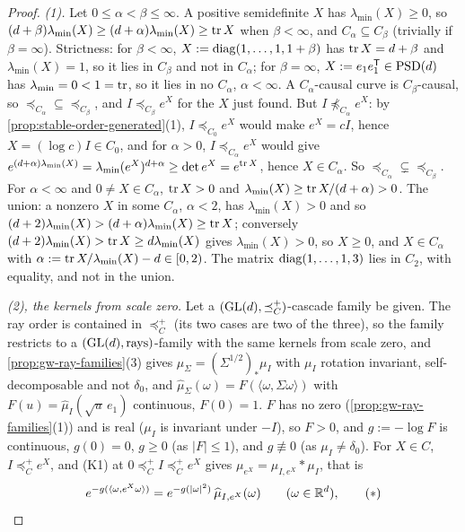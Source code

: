 \begin{proof}
\emph{(1).} Let $0 \le \alpha < \beta \le \infty$. A positive semidefinite $X$ has $\lambda_{\min}(X) \ge 0$, so
$(d+\beta)\lambda_{\min}(X) \ge (d+\alpha)\lambda_{\min}(X) \ge \operatorname{tr} X$ when $\beta < \infty$, and $C_\alpha
\subseteq C_\beta$ (trivially if $\beta = \infty$). Strictness: for $\beta < \infty$,
$X := \operatorname{diag}(1, \dots, 1, 1 + \beta)$ has $\operatorname{tr} X = d + \beta$ and $\lambda_{\min}(X) = 1$, so it lies in $C_\beta$
and not in $C_\alpha$; for $\beta = \infty$, $X := e_1e_1^{\mathsf{T}} \in \mathrm{PSD}(d)$ has $\lambda_{\min} = 0 < 1 = \operatorname{tr}$,
so it lies in no $C_\alpha$, $\alpha < \infty$. A $C_\alpha$-causal curve is $C_\beta$-causal, so
$\preceq_{C_\alpha} \subseteq \preceq_{C_\beta}$, and $I \preceq_{C_\beta} e^X$ for the $X$ just found. But
$I \not\preceq_{C_\alpha} e^X$: by \ref{prop:stable-order-generated}(1), $I \preceq_{C_0} e^X$ would make $e^X = cI$,
hence $X = (\log c)I \in C_0$, and for $\alpha > 0$, $I \preceq_{C_\alpha} e^X$ would give
$e^{(d+\alpha)\lambda_{\min}(X)} = \lambda_{\min}(e^X)^{d+\alpha} \ge \det e^X = e^{\operatorname{tr} X}$, hence $X \in C_\alpha$.
So $\preceq_{C_\alpha} \subsetneq \preceq_{C_\beta}$. For $\alpha < \infty$ and $0 \ne X \in C_\alpha$, $\operatorname{tr} X > 0$ and
$\lambda_{\min}(X) \ge \operatorname{tr} X/(d+\alpha) > 0$. The union: a nonzero $X$ in some $C_\alpha$, $\alpha < 2$, has
$\lambda_{\min}(X) > 0$ and so $(d+2)\lambda_{\min}(X) > (d+\alpha)\lambda_{\min}(X) \ge \operatorname{tr} X$; conversely
$(d+2)\lambda_{\min}(X) > \operatorname{tr} X \ge d\lambda_{\min}(X)$ gives $\lambda_{\min}(X) > 0$, so $X \ge 0$, and
$X \in C_\alpha$ with $\alpha := \operatorname{tr} X/\lambda_{\min}(X) - d \in [0, 2)$. The matrix $\operatorname{diag}(1, \dots, 1, 3)$ lies in
$C_2$, with equality, and not in the union.

\emph{(2), the kernels from scale zero.} Let a $(\mathrm{GL}(d), \preceq^+_C)$-cascade family be given. The ray order is
contained in $\preceq^+_C$ (its two cases are two of the three), so the family restricts to a
$(\mathrm{GL}(d), \text{rays})$-family with the same kernels from scale zero, and
\ref{prop:gw-ray-families}(3) gives $\mu_\Sigma = (\Sigma^{1/2})_*\mu_I$ with $\mu_I$ rotation invariant,
self-decomposable and not $\delta_0$, and $\widehat\mu_\Sigma(\omega) = F(\langle\omega,\Sigma\omega\rangle)$ with
$F(u) = \widehat\mu_I(\sqrt u\,e_1)$ continuous, $F(0) = 1$. $F$ has no zero (\ref{prop:gw-ray-families}(1)) and is
real ($\mu_I$ is invariant under $-I$), so $F > 0$, and $g := -\log F$ is continuous, $g(0) = 0$, $g \ge 0$ (as
$|F| \le 1$), and $g \not\equiv 0$ (as $\mu_I \ne \delta_0$). For $X \in C$, $I \preceq^+_C e^X$, and (K1) at
$0 \preceq^+_C I \preceq^+_C e^X$ gives $\mu_{e^X} = \mu_{I,e^X} * \mu_I$, that is
\[
  e^{-g(\langle\omega, e^X\omega\rangle)} = e^{-g(|\omega|^2)}\,\widehat\mu_{I,e^X}(\omega)
  \qquad (\omega \in \mathbb{R}^d), \qquad (\ast)
\]


\end{proof}

